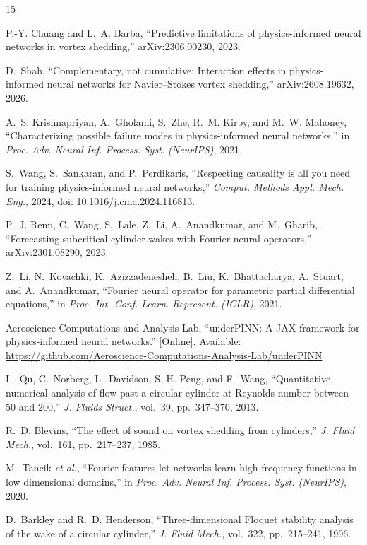 \documentclass[conference]{IEEEtran}
\begin{document}
\balance
\begin{thebibliography}{15}

P.-Y. Chuang and L.~A. Barba, ``Predictive limitations of physics-informed
neural networks in vortex shedding,'' arXiv:2306.00230, 2023.

D.~Shah, ``Complementary, not cumulative: Interaction effects in
physics-informed neural networks for Navier--Stokes vortex shedding,''
arXiv:2608.19632, 2026.

A.~S. Krishnapriyan, A.~Gholami, S.~Zhe, R.~M. Kirby, and M.~W. Mahoney,
``Characterizing possible failure modes in physics-informed neural networks,''
in \emph{Proc. Adv. Neural Inf. Process. Syst. (NeurIPS)}, 2021.

S.~Wang, S.~Sankaran, and P.~Perdikaris, ``Respecting causality is all you
need for training physics-informed neural networks,'' \emph{Comput. Methods
Appl. Mech. Eng.}, 2024, doi: 10.1016/j.cma.2024.116813.

P.~J. Renn, C.~Wang, S.~Lale, Z.~Li, A.~Anandkumar, and M.~Gharib,
``Forecasting subcritical cylinder wakes with Fourier neural operators,''
arXiv:2301.08290, 2023.

Z.~Li, N.~Kovachki, K.~Azizzadenesheli, B.~Liu, K.~Bhattacharya, A.~Stuart,
and A.~Anandkumar, ``Fourier neural operator for parametric partial
differential equations,'' in \emph{Proc. Int. Conf. Learn. Represent.
(ICLR)}, 2021.

Aeroscience Computations and Analysis Lab, ``underPINN: A JAX framework for
physics-informed neural networks.'' [Online]. Available:
\url{https://github.com/Aeroscience-Computations-Analysis-Lab/underPINN}

L.~Qu, C.~Norberg, L.~Davidson, S.-H. Peng, and F.~Wang, ``Quantitative
numerical analysis of flow past a circular cylinder at Reynolds number between
50 and 200,'' \emph{J. Fluids Struct.}, vol.~39, pp.~347--370, 2013.

R.~D. Blevins, ``The effect of sound on vortex shedding from cylinders,''
\emph{J. Fluid Mech.}, vol.~161, pp.~217--237, 1985.

M.~Tancik \emph{et al.}, ``Fourier features let networks learn high frequency
functions in low dimensional domains,'' in \emph{Proc. Adv. Neural Inf.
Process. Syst. (NeurIPS)}, 2020.

D.~Barkley and R.~D. Henderson, ``Three-dimensional Floquet stability analysis
of the wake of a circular cylinder,'' \emph{J. Fluid Mech.}, vol.~322,
pp.~215--241, 1996.


\end{thebibliography}
\end{document}
